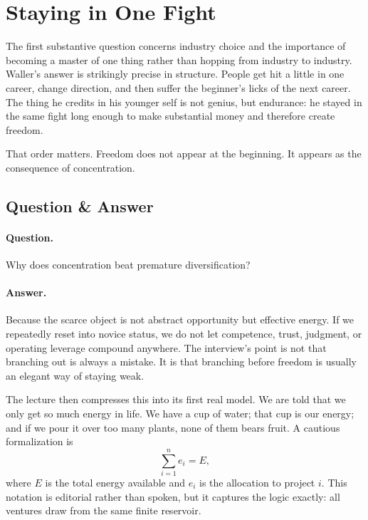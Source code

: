 \section{Staying in One Fight}

The first substantive question concerns industry choice and the importance of becoming a master of one thing rather than hopping from industry to industry. Waller's answer is strikingly precise in structure. People get hit a little in one career, change direction, and then suffer the beginner's licks of the next career. The thing he credits in his younger self is not genius, but endurance: he stayed in the same fight long enough to make substantial money and therefore create freedom.

That order matters. Freedom does not appear at the beginning. It appears as the consequence of concentration.

\subsection{Question \& Answer}

\paragraph{Question.} Why does concentration beat premature diversification?

\paragraph{Answer.} Because the scarce object is not abstract opportunity but effective energy. If we repeatedly reset into novice status, we do not let competence, trust, judgment, or operating leverage compound anywhere. The interview's point is not that branching out is always a mistake. It is that branching before freedom is usually an elegant way of staying weak.

The lecture then compresses this into its first real model. We are told that we only get so much energy in life. We have a cup of water; that cup is our energy; and if we pour it over too many plants, none of them bears fruit. A cautious formalization is
\begin{equation}
\sum_{i=1}^{n} e_i = E,
\end{equation}
where \(E\) is the total energy available and \(e_i\) is the allocation to project \(i\). This notation is editorial rather than spoken, but it captures the logic exactly: all ventures draw from the same finite reservoir.

